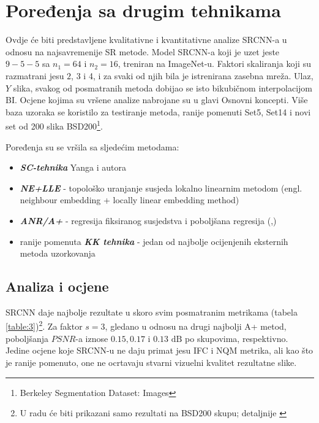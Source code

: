 \documentclass[12pt]{report}
\numberwithin{equation}{section}
\begin{document}
  \section{Poređenja sa drugim tehnikama}
  
  Ovdje će biti predstavljene kvalitativne i kvantitativne analize SRCNN-a u odnosu na najsavremenije SR metode. Model SRCNN-a koji je uzet jeste $9-5-5$ sa $n_1=64$ i $n_2=16$, treniran na ImageNet-u. Faktori skaliranja koji su razmatrani jesu $2$, $3$ i 4, i za svaki od njih bila je istrenirana zasebna mreža. Ulaz, $Y$ slika, svakog od posmatranih metoda dobijao se isto bikubičnom interpolacijom BI. Ocjene kojima su vršene analize nabrojane su u glavi Osnovni koncepti. Više baza uzoraka se koristilo za testiranje metoda, ranije pomenuti Set5, Set14 i novi set od 200 slika BSD200\footnote{Berkeley Segmentation Dataset: Images}.  
  
  Poređenja su se vršila sa sljedećim metodama: 

  
 \begin{itemize}
  
 \item \textbf{\textit{SC-tehnika}} Yanga i autora \cite{sparse1}
 \item \textbf{\textit{NE+LLE}} - topološko uranjanje susjeda lokalno linearnim metodom (engl. neighbour embedding + locally linear embedding method) \cite{nelle}
 \item \textbf{\textit{ANR/A+}} - regresija fiksiranog susjedstva i poboljšana regresija  (\cite{anr},\cite{aplus})
 \item ranije pomenuta \textit{\textbf{KK tehnika}} - jedan od najbolje ocijenjenih eksternih metoda uzorkovanja\cite{kernel} 
  
\end{itemize}   

   \subsection{Analiza i ocjene}
   
 SRCNN daje najbolje rezultate u skoro svim posmatranim metrikama (tabela \ref{table:3})\footnote{U radu će biti prikazani samo rezultati na BSD200 skupu; detaljnije \cite{main}}. Za faktor $s=3$, gledano u odnosu na drugi najbolji A+ metod, poboljšanja $PSNR$-a iznose $0.15, 0.17$ i $0.13\text{ dB}$ po skupovima, respektivno. Jedine ocjene koje SRCNN-u ne daju primat jesu  IFC i NQM metrika, ali kao što je ranije pomenuto, one ne ocrtavaju stvarni vizuelni kvalitet rezultatne slike. 
 
\end{document}
